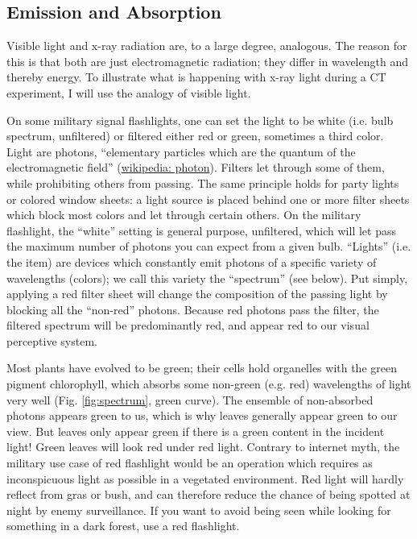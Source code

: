 \subsection{Emission and Absorption}
\label{sec:orgc26eb5e}
Visible light and x-ray radiation are, to a large degree, analogous.
The reason for this is that both are just electromagnetic radiation; they differ in wavelength and thereby energy.
To illustrate what is happening with x-ray light during a CT experiment, I will use the analogy of visible light.


On some military signal flashlights, one can set the light to be white (i.e. bulb spectrum, unfiltered) or filtered either red or green, sometimes a third color.
Light are photons, ``elementary particles which are the quantum of the electromagnetic field'' (\href{https://en.wikipedia.org/wiki/Photon}{wikipedia: photon}).
Filters let through some of them, while prohibiting others from passing.
The same principle holds for party lights or colored window sheets: a light source is placed behind one or more filter sheets which block most colors and let through certain others.
On the military flashlight, the ``white'' setting is general purpose, unfiltered, which will let pass the maximum number of photons you can expect from a given bulb.
``Lights'' (i.e. the item) are devices which constantly emit photons of a specific variety of wavelengths (colors); we call this variety the ``spectrum'' (see below).
Put simply, applying a red filter sheet will change the composition of the passing light by blocking all the ``non-red'' photons.
Because red photons pass the filter, the filtered spectrum will be predominantly red, and appear red to our visual perceptive system.

Most plants have evolved to be green; their cells hold organelles with the green pigment chlorophyll, which absorbs some non-green (e.g. red) wavelengths of light very well (Fig. \ref{fig:spectrum}, green curve).
The ensemble of non-absorbed photons appears green to us, which is why leaves generally appear green to our view.
But leaves only appear green if there is a green content in the incident light!
Green leaves will look red under red light.
Contrary to internet myth, the military use case of red flashlight would be an operation which requires as inconspicuous light as possible in a vegetated environment.
Red light will hardly reflect from gras or bush, and can therefore reduce the chance of being spotted at night by enemy surveillance.
If you want to avoid being seen while looking for something in a dark forest, use a red flashlight.


